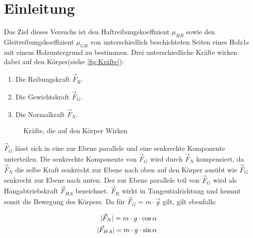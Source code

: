 \section{Einleitung}

Das Ziel dieses Versuchs ist den Haftreibungskoeffizient $\mu_{HR}$ sowie den Gleitreibungskoeffizient $\mu_{GR}$ von unterschiedlich beschichteten Seiten eines Holz1s mit einem Holzuntergrund zu bestimmen.
\newline
Drei unterschiedliche Kräfte wirken dabei auf den Körper(siehe \autoref{fig:Kräfte}):
\begin{enumerate}
    \item Die Reibungskraft $\vec{F}_R$.
    \item Die Gewichtskraft $\vec{F}_G$.
    \item Die Normalkraft $\vec{F}_N$.
\end{enumerate}


\usetikzlibrary{angles,quotes}
\begin{figure}
    \centering 
    
    \caption[Kräfte am Körper]{Kräfte, die auf den Körper Wirken \cite{schiefeEbene:Fromme}}
    \label{fig:Kräfte}
\end{figure}

$\vec{F}_G$ lässt sich in eine zur Ebene parallele und eine senkrechte Komponente unterteilen. Die senkrechte Komponente von $\vec{F}_G$ wird durch $\vec{F}_N$ kompensiert, da $\vec{F}_N$ die selbe Kraft senkrecht zur Ebene nach oben auf den Körper ausübt wie $\vec{F}_G$ senkrecht zur Ebene nach unten. Der zur Ebene parallele teil von $\vec{F}_G$ wird als Hangabtriebskraft $\vec{F}_{HA}$ bezeichnet. $\vec{F}_R$ wirkt in Tangentialrichtung und hemmt somit die Bewegung des Körpers.\newline
Da für $\vec{F}_{G} = m \cdot \vec{g}$ gilt, gilt ebenfalls:

\begin{align}
    \lvert\vec{F}_{N}\rvert = m \cdot g \cdot \cos{\alpha} \label{eq:F_N} \\
    \lvert\vec{F}_{HA}\rvert = m \cdot g \cdot \sin{\alpha} \label{eq:F_HA}
\end{align}


